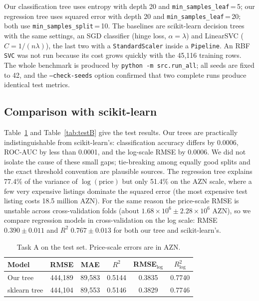 \documentclass[10pt,twocolumn,a4paper]{article}
\begin{document}
Our classification tree uses entropy with depth 20 and
\texttt{min\_samples\_leaf}\,=\,5; our regression tree uses squared error
with depth 20 and \texttt{min\_samples\_leaf}\,=\,20; both use
\texttt{min\_samples\_split}\,=\,10. The baselines are scikit-learn decision
trees with the same settings, an SGD classifier (hinge loss, $\alpha=\lambda$)
and LinearSVC ($C=1/(n\lambda)$), the last two with a \texttt{StandardScaler}
inside a \texttt{Pipeline}. An RBF \texttt{SVC} was not run because its cost
grows quickly with the 45{,}116 training rows. The whole benchmark is produced
by \texttt{python -m src.run\_all}; all seeds are fixed to 42, and the
\texttt{--check-seeds} option confirmed that two complete runs produce
identical test metrics.

\subsection{Comparison with scikit-learn}
Table~\ref{tab:testA} and Table~\ref{tab:testB} give the test results. Our
trees are practically indistinguishable from scikit-learn's: classification
accuracy differs by 0.0006, ROC-AUC by less than 0.0001, and the log-scale RMSE by
0.0006. We did not isolate the cause of these small gaps; tie-breaking among
equally good splits and the exact threshold convention are plausible sources.
The regression tree explains 77.4\% of the variance of $\log(\text{price})$ but
only 51.4\% on the AZN scale, where a few very expensive listings dominate the
squared error (the most expensive test listing costs 18.5 million AZN). For
the same reason the price-scale RMSE is unstable across cross-validation folds
(about $1.68\times10^{6}\pm2.28\times10^{6}$ AZN), so we compare regression
models in cross-validation on the log scale: RMSE $0.390\pm0.011$ and $R^2$
$0.767\pm0.013$ for both our tree and scikit-learn's.

\begin{table}[t]
  \centering
  \footnotesize
  \caption{Task A on the test set. Price-scale errors are in AZN.}
  \label{tab:testA}
  \begin{tabular}{@{}lccccc@{}}
    \toprule
    Model & RMSE & MAE & $R^2$ & RMSE$_{\log}$ & $R^2_{\log}$ \\
    \midrule
    Our tree     & 444{,}189 & 89{,}583 & 0.5144 & 0.3835 & 0.7740 \\
    sklearn tree & 444{,}104 & 89{,}553 & 0.5146 & 0.3829 & 0.7746 \\
    \bottomrule
  \end{tabular}
\end{table}
\end{document}
